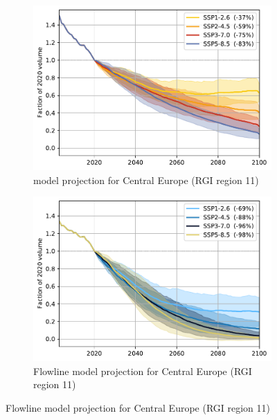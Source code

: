       \begin{figure}[b!]
          \centering
          \begin{subfigure}[b]{0.476\textwidth}
              \caption{\Vas{} model projection for Central Europe (RGI region 11) }
              \label{fig:cmip:vas_reg_11}
              \centering
              \includegraphics[width=\textwidth]{../plots/final_plots/time_series/cmip/cmip_vas_11.pdf}
          \end{subfigure}
          \hfill
          \begin{subfigure}[b]{0.476\textwidth}
              \caption{Flowline model projection for Central Europe (RGI region 11) }
              \label{fig:cmip:fl_reg_11}
              \centering
              \includegraphics[width=\textwidth]{../plots/final_plots/time_series/cmip/cmip_fl_11.pdf}
          \end{subfigure}


\end{figure}
